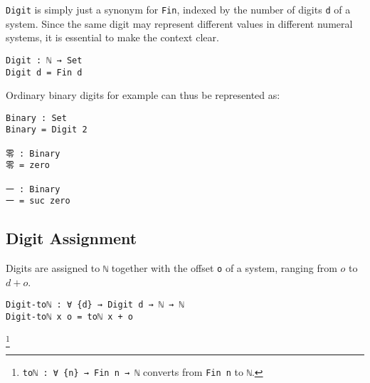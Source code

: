 \documentclass[../thesis.tex]{subfiles}
\begin{document}
{\lstinline|Digit|} is simply just a synonym for {\lstinline|Fin|}, indexed by
the number of digits {\lstinline|d|} of a system.
Since the same digit may represent different values in different numeral systems,
it is essential to make the context clear.

\begin{lstlisting}
Digit : ℕ → Set
Digit d = Fin d
\end{lstlisting}

Ordinary binary digits for example can thus be represented as:

\begin{lstlisting}
Binary : Set
Binary = Digit 2

零 : Binary
零 = zero

一 : Binary
一 = suc zero
\end{lstlisting}

\subsection{Digit Assignment}

\begin{center}
\end{center}

Digits are assigned to {\lstinline|ℕ|} together with the offset {\lstinline|o|} of a system,
ranging from $ o $ to $ d + o $.

\begin{lstlisting}
Digit-toℕ : ∀ {d} → Digit d → ℕ → ℕ
Digit-toℕ x o = toℕ x + o
\end{lstlisting}
\footnote{
    {\lstinline|toℕ : ∀ {n} → Fin n → ℕ|}
    \newline\hspace*{4em} converts from {\lstinline|Fin n|} to {\lstinline|ℕ|}.
}
\end{document}
